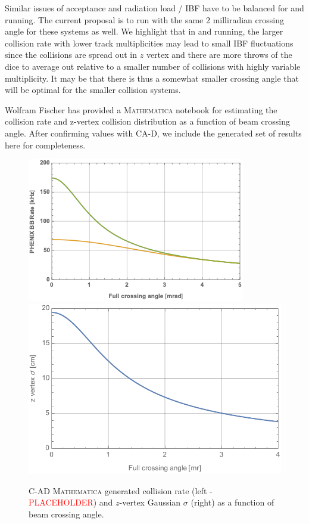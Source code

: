 Similar issues of acceptance and radiation load / IBF have to be balanced for \pp and \pau running.   The current proposal is to run with the same 2 milliradian crossing angle for these systems as well.    We highlight that in \pp and \pau running, the larger collision rate with lower track multiplicities may lead to small IBF fluctuations since the collisions are spread out in $z$ vertex and there are more throws of the dice to average out relative to a smaller number of \auau collisions with highly variable multiplicity.     It may be that there is thus a somewhat smaller crossing angle that will be optimal for the smaller collision systems.    

Wolfram Fischer has provided a {\textsc{Mathematica}} notebook for estimating the collision rate and z-vertex collision distribution as a function of beam crossing angle.\cite{Ruggiero:2002jn}  After confirming values with CA-D, we include the generated set of results here for completeness.    

\begin{figure}
    \centering
        \includegraphics[width=0.47\linewidth]{figs/figure_cad1_prelim.png}  
    \includegraphics[width=0.47\linewidth]{figs/auau2023-202008130.pdf}
    \caption{C-AD {\textsc{Mathematica}} generated \auau collision rate (left - {\textcolor{red}{PLACEHOLDER}}) and $z$-vertex Gaussian $\sigma$ (right) as a function of beam crossing angle.}
    \label{fig:mathauau1}
\end{figure}

